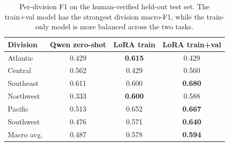 \begin{table}[t]
\centering
\small
\begin{tabular}{lccc}
\toprule
Division & Qwen zero-shot & LoRA train & LoRA train+val \\
\midrule
Atlantic & 0.429 & \textbf{0.615} & 0.429 \\
Central & 0.562 & 0.429 & 0.560 \\
Southeast & 0.611 & 0.600 & \textbf{0.680} \\
Northwest & 0.333 & \textbf{0.600} & 0.588 \\
Pacific & 0.513 & 0.652 & \textbf{0.667} \\
Southwest & 0.476 & 0.571 & \textbf{0.640} \\
\midrule
Macro avg. & 0.487 & 0.578 & \textbf{0.594} \\
\bottomrule
\end{tabular}
\caption{Per-division F1 on the human-verified held-out test set. The train+val model has the strongest division macro-F1, while the train-only model is more balanced across the two tasks.}
\label{tab:test_division_f1}
\end{table}
